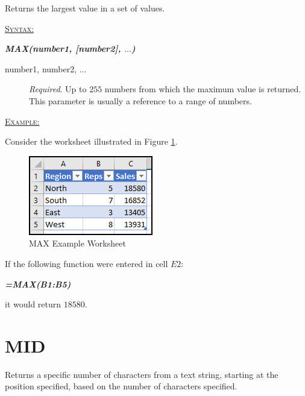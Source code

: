 Returns the largest value in a set of values. 

\begin{addmargin}[1cm]{0cm}
	
	\medskip
	\underline{\textsc{Syntax:}}
	\medskip
	
	{\color{Syntax}
		\noindent\textbf{\textit{MAX(number1, [number2], $\ldots$)}}
	}
	
	\begin{description}
		\item[number1, number2, $\ldots$] \textit{Required}. Up to $ 255 $ numbers from which the maximum value is returned. This parameter is usually a reference to a range of numbers.
	\end{description}

	\medskip
	\noindent\underline{\textsc{Example:}}
	\medskip
	
	\noindent Consider the worksheet illustrated in Figure \ref{apa:max}.
	
	\begin{figure}[H]
		\centering
		\includegraphics[width=\maxwidth{.45\linewidth}]{gfx/apa_fig01}
		\caption{MAX Example Worksheet}
		\label{apa:max}
	\end{figure}
	
	\noindent If the following function were entered in cell $ E2 $:
	
	{\color{Syntax}
		\textit{\textbf{=MAX(B1:B5)}}
	}
	
	\noindent it would return $ 18580 $.

\end{addmargin}

\section{MID}

Returns a specific number of characters from a text string, starting at the position specified, based on the number of characters specified.

